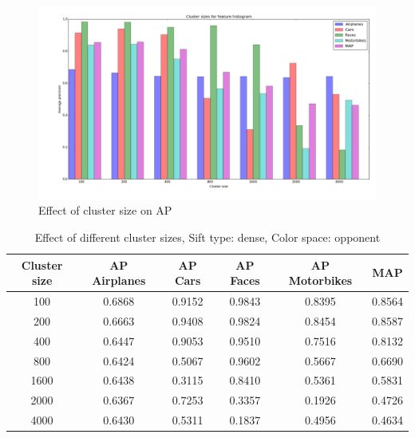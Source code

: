 \begin{figure}[H]
\includegraphics[width=\textwidth]{plots/cluster_size_feature_histograms}
\caption{Effect of cluster size on AP}
\end{figure}
\begin{table}[H]
\begin{tabular}{|c|ccccc|}
\hline
\textbf{Cluster size} & \textbf{AP Airplanes} & \textbf{AP Cars} & \textbf{AP Faces} & \textbf{AP Motorbikes} & \textbf{MAP}\\
\hline
100& 0.6868 & 0.9152 & 0.9843 & 0.8395 & 0.8564\\
200 & 0.6663 & 0.9408 & 0.9824 & 0.8454 & 0.8587\\
400 & 0.6447 & 0.9053 & 0.9510 & 0.7516 & 0.8132\\
800 & 0.6424 & 0.5067 & 0.9602 & 0.5667 & 0.6690\\
1600 & 0.6438 & 0.3115 & 0.8410 & 0.5361 & 0.5831\\
2000 & 0.6367 & 0.7253 & 0.3357 & 0.1926 & 0.4726\\
4000 & 0.6430 & 0.5311 & 0.1837 & 0.4956 & 0.4634\\
\hline
\end{tabular}
\caption{Effect of different cluster sizes, Sift type: dense, Color space: opponent}
\end{table}

